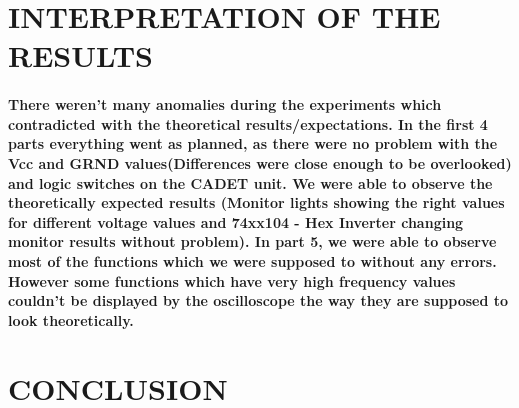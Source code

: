 \documentclass[pdftex,12pt,a4paper]{article}
\begin{document}
\section{INTERPRETATION OF THE RESULTS }
\begin{flushleft}


\paragraph{There weren't many anomalies during the experiments which contradicted with the theoretical results/expectations. In the first 4 parts everything went as planned, as there were no problem with the Vcc and GRND values(Differences were close enough to be overlooked) and logic switches on the CADET unit. We were able to observe the theoretically expected results (Monitor lights showing the right values for different voltage values and 74xx104 - Hex Inverter changing monitor results without problem). In part 5, we were able to observe most of the functions which we were supposed to without any errors. However some functions which have very high frequency values couldn't be displayed by the oscilloscope the way they are supposed to look theoretically.}
\end{flushleft}
\section{CONCLUSION }
\end{document}
